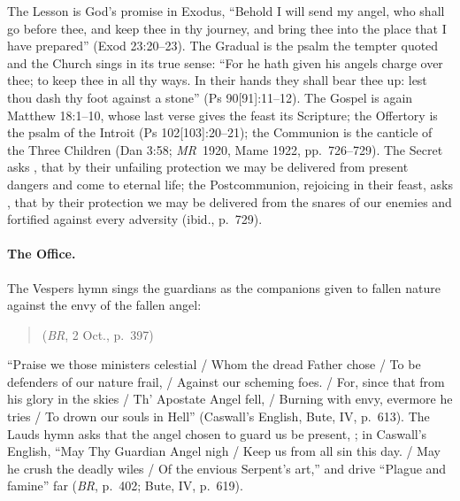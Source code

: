 The Lesson is God's promise in Exodus, ``Behold I will send my angel, who
shall go before thee, and keep thee in thy journey, and bring thee into
the place that I have prepared'' (Exod 23:20--23). The Gradual is the
psalm the tempter quoted and the Church sings in its true sense: ``For he
hath given his angels charge over thee; to keep thee in all thy ways. In
their hands they shall bear thee up: lest thou dash thy foot against a
stone'' (Ps 90[91]:11--12). The Gospel is again Matthew 18:1--10, whose
last verse gives the feast its Scripture; the Offertory is the psalm of
the Introit (Ps 102[103]:20--21); the Communion is the canticle of the
Three Children (Dan 3:58; \emph{MR}~1920, Mame 1922, pp.~726--729). The
Secret asks , that by their unfailing
protection we may be delivered from present dangers and come to eternal
life; the Postcommunion, rejoicing in their feast, asks , that by their protection we may be delivered from the snares
of our enemies and fortified against every adversity (ibid., p.~729).

\paragraph{The Office.} The Vespers hymn  sings the guardians as the companions given to fallen nature
against the envy of the fallen angel:
\begin{quote}
 (\emph{BR}, 2 Oct., p.~397)
\end{quote}
``Praise we those ministers celestial / Whom the dread Father chose / To be
defenders of our nature frail, / Against our scheming foes. / For, since
that from his glory in the skies / Th' Apostate Angel fell, / Burning with
envy, evermore he tries / To drown our souls in Hell'' (Caswall's
English, Bute, IV, p.~613). The Lauds hymn asks that the angel chosen
to guard us be present, ; in Caswall's English, ``May Thy Guardian Angel
nigh / Keep us from all sin this day. / May he crush the deadly wiles /
Of the envious Serpent's art,'' and drive ``Plague and famine'' far
(\emph{BR}, p.~402; Bute, IV, p.~619).

